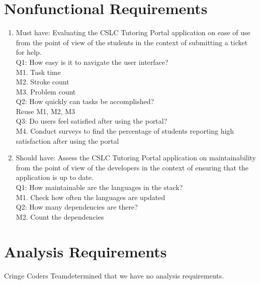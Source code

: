 \documentclass[oneside,openany,obeyspaces]{book}
\newcommand\tab[1][1cm]{\hspace*{#1}}
\newcommand\TeamName{Cringe Coders Team}
\begin{document}
\begin{flushleft}
    \section{Nonfunctional Requirements}

    \begin{enumerate}
        \item Must have: Evaluating the CSLC Tutoring Portal application on ease of use from the point of view of the students in the context of submitting a ticket for help.\\
              \tab Q1: How easy is it to navigate the user interface?\\
              \tab\tab M1. Task time\\
              \tab\tab M2. Stroke count\\
              \tab\tab M3. Problem count\\
              \tab Q2: How quickly can tasks be accomplished?\\
              \tab\tab Reuse M1, M2, M3\\
              \tab Q3: Do users feel satisfied after using the portal?\\
              \tab\tab M4. Conduct surveys to find the percentage of students reporting high satisfaction after using the portal\\

        \item Should have: Assess the CSLC Tutoring Portal application on maintainability from the point of view of the developers in the context of ensuring that the application is up to date.\\
              \tab Q1: How maintainable are the languages in the stack?\\
              \tab\tab M1. Check how often the languages are updated\\
              \tab Q2: How many dependencies are there?\\
              \tab\tab M2. Count the dependencies\\
    \end{enumerate}


    \section{Analysis Requirements}

    \tab \TeamName determined that we have no analysis requirements.\\~\\



\end{flushleft}
\end{document}
